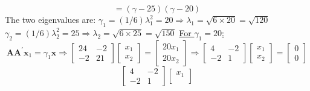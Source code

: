 \begin{enumerate}[label=(\alph*)]
\[                =
                (\gamma - 25)(\gamma - 20)
            \]
            The two eigenvalues are:
            \newline
            $\gamma_1=(1/6)\lambda_1^2= 20 \Rightarrow \lambda_1 = \sqrt{6 \times 20} = \sqrt{120}$
            \newline
            $\gamma_2=(1/6)\lambda_2^2= 25 \Rightarrow \lambda_2 = \sqrt{6 \times 25} = \sqrt{150}$
            \newline
            \newline
            \underline{For $\gamma_1 = 20$:}
            \[
                \mathbf{A}\mathbf{A}^\prime\mathbf{x}_1 = \gamma_1\mathbf{x}
                \Rightarrow
                \begin{bmatrix}
                    24 & -2 \\
                    -2 & 21
                \end{bmatrix}
                \begin{bmatrix}
                    x_1 \\
                    x_2
                \end{bmatrix}
                =
                \begin{bmatrix}
                    20 x_1\\
                    20 x_2
                \end{bmatrix}
                \Rightarrow
                \begin{bmatrix}
                    4 & -2 \\
                    -2 & 1
                \end{bmatrix}
                \begin{bmatrix}
                    x_1 \\
                    x_2
                \end{bmatrix}
                =
                \begin{bmatrix}
                    0 \\
                    0
                \end{bmatrix}
            \]
            \[
                \begin{bmatrix}
                    4 & -2 \\
                    -2 & 1
                \end{bmatrix}
                \begin{bmatrix}
                    x_1 \\

\end{bmatrix}\]
\end{enumerate}
